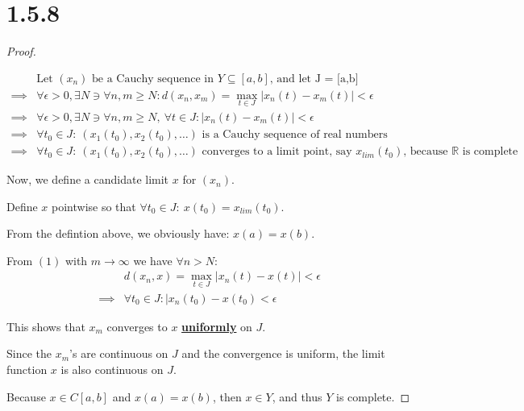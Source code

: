 \documentclass{article}
\begin{document}
\section*{1.5.8}
\begin{proof}
  $ $

  \setcounter{equation}{0}
  \begin{align}
    &\text{Let } (x_n) \text{ be a Cauchy sequence in } Y \subseteq [a,b] \text{, and let J = [a,b]} \nonumber \\
    \implies& 
    \forall \epsilon>0, 
    \exists N 
    \ni \forall n,m \geq N: 
    d(x_n, x_m) = \max\limits_{t \in J} |x_n(t) - x_m(t)| < \epsilon \\
    \implies& 
    \forall \epsilon>0, 
    \exists N 
    \ni \forall n,m \geq N, 
    \: \forall t \in J: 
    |x_n(t) - x_m(t)| < \epsilon \nonumber \\
    \implies& 
    \forall t_0 \in J:
    \: (x_1(t_0), x_2(t_0), \ldots) \text{ is a Cauchy sequence of real numbers} \nonumber \\
    \implies& 
    \forall t_0 \in J:
    \: (x_1(t_0), x_2(t_0), \ldots) \text{ converges to a limit point, say } x_{lim}(t_0) \text{, because } \mathbb{R} \text{ is complete} \nonumber
  \end{align}

  Now, we define a candidate limit $x$ for $(x_n)$.
  \newline

  Define $x$ pointwise so that $\forall t_0 \in J: \: x(t_0) = x_{lim}(t_0)$.
  \newline

  From the defintion above, we obviously have: $x(a) = x(b)$.
  \newline

  From $(1)$ with $m \to \infty$ we have $\forall n > N$:
  \begin{align*}
    &d(x_n, x) = \max\limits_{t \in J} |x_n(t) - x(t)| < \epsilon \\
    \implies& \forall t_0 \in J: |x_n(t_0) - x(t_0) < \epsilon
  \end{align*}

  This shows that $x_m$ converges to $x$ \textbf{\underline{uniformly}} on $J$.
  \newline

  Since the $x_m$'s are continuous on $J$ and the convergence is uniform, the limit function $x$ is also continuous on $J$.
  \newline
  
  Because $x \in C[a,b]$ and $x(a) = x(b)$, then $x \in Y$, and thus $Y$ is complete.

\end{proof}
\end{document}
